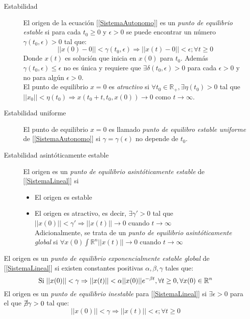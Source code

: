 \documentclass[12pt,spanish,lettersize]{report}
\begin{document}
\begin{description}
\item[Estabilidad]
El origen de la ecuaci\'on [\ref{SistemaAutonomo}] es un \emph{punto de equilibrio estable} si para cada $t_0\ge 0$ y $\epsilon > 0$ se puede encontrar un n\'umero $\gamma(t_0,\epsilon) > 0$ tal que:
\begin{equation}
||x(0)-0||<\gamma(t_0,\epsilon)\Rightarrow ||x(t)-0||<\epsilon; \forall t\ge0
\end{equation}
Donde $x(t)$ es soluci\'on que inicia en $x(0)$ para $t_0$. Adem\'as $\gamma(t_0,\epsilon)\le\epsilon$ no es \'unica y requiere que $\exists \delta(t_0,\epsilon)>0$ para cada $\epsilon>0$ y no para alg\'un $\epsilon>0$.\\
El punto de equilibrio $x=0$ es \emph{atractivo} si $\forall t_0\in\mathbb{R}_+, \exists \eta(t_0)>0$ tal que $||x_0|| <\eta(t_0)\Rightarrow x(t_0+t,t_0,x(0))\rightarrow 0$ como $t\rightarrow\infty$.
\item[Estabilidad uniforme] El punto de equilibrio $x=0$ es llamado \emph{punto de equilibro estable uniforme} de [\ref{SistemaAutonomo}] si $\gamma=\gamma(\epsilon)$ no depende de $t_0$.
\item[Estabilidad asint\'oticamente estable] El origen es un \emph{punto de equilibrio asint\'oticamente estable} de [\ref{SistemaLineal}] si
\begin{itemize}
\item El origen es estable
\item El origen es atractivo, es decir, $\exists \gamma'>0$ tal que $||x(0)||<\gamma'\Rightarrow||x(t)||\rightarrow0$ cuando $t\rightarrow\infty$\\
Adicionalmente, se trata de un \emph{punto de equilibrio asint\'oticamente global} si $\forall x(0)\int\mathbb{R}^n ||x(t)||\rightarrow 0$ cuando $t\rightarrow\infty$
\end{itemize}
\end{description}
El origen es un \emph{punto de equilibrio exponencialmente estable global} de [\ref{SistemaLineal}] si existen constantes positivas $\alpha, \beta, \gamma$ tales que:
\begin{equation}
\textnormal{Si }||x(0)||<\gamma\Rightarrow||x(t)||<\alpha||x(0)||e^{-\beta t}, \forall t\ge 0, \forall x(0)\in\mathbb{R}^n
\end{equation}
El origen es un \emph{punto de equilibrio inestable} para [\ref{SistemaLineal}] si $\exists \epsilon>0$ para el que $\cancel{\exists}\gamma>0$ tal que:
\begin{equation}
||x(0)||<\gamma\Rightarrow||x(t)||<\epsilon ; \forall t\ge 0
\end{equation}
\end{document}
